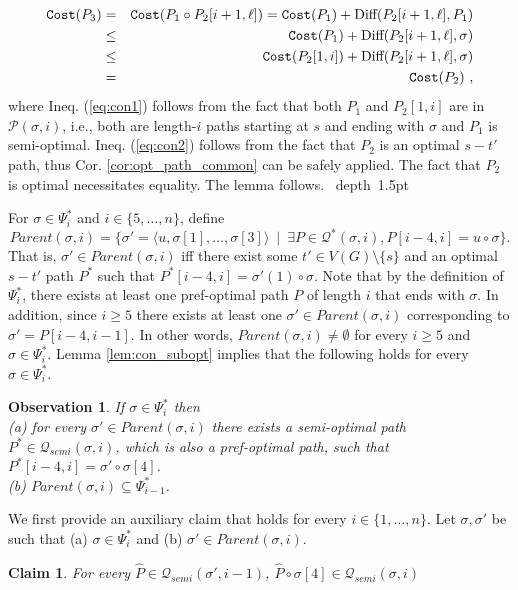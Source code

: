 \documentclass[12pt]{article}
\newtheorem{observation}[theorem]{Observation}
\newtheorem{claim}{Claim}[section]
\def\Cost{\mbox{\tt Cost}}
\def\blackslug{\hbox{\hskip 1pt \vrule width 4pt height 8pt
    depth 1.5pt \hskip 1pt}}
\def\QED{\quad\blackslug\lower 8.5pt\null\par}
\newcommand{\DIFF}[0]{\mbox{Diff}}
\newcommand{\DegThreeConst}[0]{4}
\def\Cost{\mbox{\tt Cost}}
\begin{document}
\begin{eqnarray}
\Cost(P_3)&=& \Cost(P_1 \circ P_2[i+1, \ell])= \Cost(P_1) +\DIFF(P_2[i+1, \ell], P_1) \nonumber
\\& \leq &
\Cost(P_1) +\DIFF(P_2[i+1, \ell], \sigma) \nonumber
\\& \leq &
\Cost(P_2[1,i]) +\DIFF(P_2[i+1, \ell], \sigma) \label{eq:con1}
\\& = &
\Cost(P_2)~, \label{eq:con2}
\end{eqnarray}
where Ineq. (\ref{eq:con1}) follows from the fact that both $P_1$ and $P_2[1,i]$ are in $\mathcal{P}(\sigma,i)$, i.e., both are length-$i$ paths starting at $s$ and ending with $\sigma$ and $P_1$ is semi-optimal. Ineq. (\ref{eq:con2}) follows from the fact that $P_2$ is an optimal $s-t'$ path, thus Cor. \ref{cor:opt_path_common} can be safely applied. The fact that $P_2$ is optimal necessitates equality. The lemma follows.
\QED
For $\sigma \in \Psi^{*}_{i}$ and $i \in \{5, \ldots, n\}$, define $$Parent(\sigma,i)=\{\sigma'= \langle u,\sigma[1], \ldots, \sigma[3] \rangle~\mid~ \exists P \in \mathcal{Q}^{*}(\sigma,i), P[i-\DegThreeConst,i]=u \circ \sigma\}.$$
That is, $\sigma' \in Parent(\sigma,i)$ iff there exist some $t' \in V(G) \setminus \{s\}$ and an optimal $s-t'$ path $P^{*}$ such that $P^{*}[i-\DegThreeConst,i]=\sigma'(1) \circ \sigma$.
Note that by the definition of $\Psi^{*}_{i}$, there exists at least one pref-optimal path $P$ of length $i$ that ends with $\sigma$. In addition, since $i\geq 5$ there exists at least one $\sigma' \in Parent(\sigma,i)$ corresponding to $\sigma'=P[i-\DegThreeConst, i-1]$. In other words, $Parent(\sigma,i) \neq \emptyset$ for every $i\geq 5$ and $\sigma \in \Psi^{*}_{i}$.
Lemma \ref{lem:con_subopt} implies that the following holds for every $\sigma \in \Psi_{i}^{*}$.
\begin{observation}
\label{cl:parent_opt}
If $\sigma \in \Psi^{*}_{i}$ then \\
(a) for every $\sigma' \in Parent(\sigma,i)$ there exists a semi-optimal path $P^{*} \in \mathcal{Q}_{semi}(\sigma,i)$, which is also a pref-optimal path, such that $P^{*}[i-\DegThreeConst,i]=\sigma' \circ \sigma[\DegThreeConst]$.\\
(b) $Parent(\sigma,i) \subseteq \Psi^{*}_{i-1}$.
\end{observation}
We first provide an auxiliary claim that holds for every $i \in \{1, \ldots, n\}$. Let $\sigma,\sigma'$ be such that (a) $\sigma \in \Psi^{*}_{i}$ and
(b) $\sigma' \in Parent(\sigma,i)$.
\begin{claim}
\label{cl:nn}
For every $\widehat{P} \in \mathcal{Q}_{semi}(\sigma',i-1)$, $\widehat{P} \circ \sigma[\DegThreeConst] \in  \mathcal{Q}_{semi}(\sigma,i)$
\end{claim}
\end{document}
